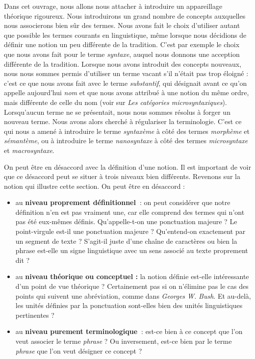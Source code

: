 {    Dans cet ouvrage, nous allons nous attacher à introduire un appareillage théorique rigoureux. Nous introduirons un grand nombre de concepts auxquelles nous associerons bien sûr des termes. Nous avons fait le choix d’utiliser autant que possible les termes courants en linguistique, même lorsque nous décidions de définir une notion un peu différente de la tradition. C’est par exemple le choix que nous avons fait pour le terme \textit{syntaxe}, auquel nous donnons une acception différente de la tradition. Lorsque nous avons introduit des concepts nouveaux, nous nous sommes permis d’utiliser un terme vacant s’il n’était pas trop éloigné : c’est ce que nous avons fait avec le terme \textit{substantif}, qui désignait avant ce qu’on appelle aujourd’hui \textit{nom} et que nous avons attribué à une notion du même ordre, mais différente de celle du nom (voir  sur \textit{Les catégories microsyntaxiques}). Lorsqu’aucun terme ne se présentait, nous nous sommes résolus à forger un nouveau terme. Nous avons alors cherché à régulariser la terminologie. C’est ce qui nous a amené à introduire le terme \textit{syntaxème} à côté des termes \textit{morphème} et \textit{sémantème}, ou à introduire le terme \textit{nanosyntaxe} à côté des termes \textit{microsyntaxe} et \textit{macrosyntaxe}.

    On peut être en désaccord avec la définition d’une notion. Il est important de voir que ce désaccord peut se situer à trois niveaux bien différents. Revenons sur la notion qui illustre cette section. On peut être en désaccord :

    \begin{itemize}
    \item  au \textbf{niveau proprement définitionnel~}: on peut considérer que notre définition n’en est pas vraiment une, car elle comprend des termes qui n’ont pas été eux-mêmes définis. Qu’appelle-t-on une ponctuation majeure ? Le point-virgule est-il une ponctuation majeure ? Qu’entend-on exactement par un segment de texte ? S’agit-il juste d’une chaîne de caractères ou bien la phrase est-elle un signe linguistique avec un sens associé au texte proprement dit ?
    \item  au \textbf{niveau théorique ou conceptuel :} la notion définie est-elle intéressante d’un point de vue théorique ? Certainement pas si on n’élimine pas le cas des points qui suivent une abréviation, comme dans \textit{Georges W.} \textit{Bush}. Et au-delà, les unités définies par la ponctuation sont-elles bien des unités linguistiques pertinentes ?
    \item  au \textbf{niveau purement terminologique~}: est-ce bien à ce concept que l’on veut associer le terme \textit{phrase} ? Ou inversement, est-ce bien par le terme \textit{phrase} que l’on veut désigner ce concept ?
    \end{itemize}

}
